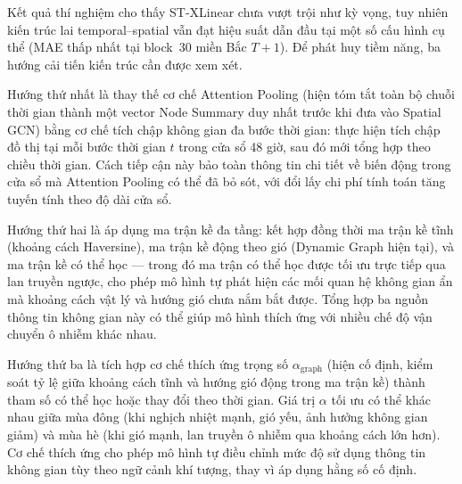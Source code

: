 Kết quả thí nghiệm cho thấy ST-XLinear chưa vượt trội như kỳ vọng, tuy nhiên kiến trúc lai temporal--spatial vẫn đạt hiệu suất dẫn đầu tại một số cấu hình cụ thể (MAE thấp nhất tại block~30 miền Bắc $T{+}1$). Để phát huy tiềm năng, ba hướng cải tiến kiến trúc cần được xem xét.

Hướng thứ nhất là thay thế cơ chế Attention Pooling (hiện tóm tắt toàn bộ chuỗi thời gian thành một vector Node Summary duy nhất trước khi đưa vào Spatial GCN) bằng cơ chế tích chập không gian đa bước thời gian: thực hiện tích chập đồ thị tại mỗi bước thời gian $t$ trong cửa sổ 48 giờ, sau đó mới tổng hợp theo chiều thời gian. Cách tiếp cận này bảo toàn thông tin chi tiết về biến động trong cửa sổ mà Attention Pooling có thể đã bỏ sót, với đổi lấy chi phí tính toán tăng tuyến tính theo độ dài cửa sổ.

Hướng thứ hai là áp dụng ma trận kề đa tầng: kết hợp đồng thời ma trận kề tĩnh (khoảng cách Haversine), ma trận kề động theo gió (Dynamic Graph hiện tại), và ma trận kề có thể học --- trong đó ma trận có thể học được tối ưu trực tiếp qua lan truyền ngược, cho phép mô hình tự phát hiện các mối quan hệ không gian ẩn mà khoảng cách vật lý và hướng gió chưa nắm bắt được. Tổng hợp ba nguồn thông tin không gian này có thể giúp mô hình thích ứng với nhiều chế độ vận chuyển ô nhiễm khác nhau.

Hướng thứ ba là tích hợp cơ chế thích ứng trọng số $\alpha_{\text{graph}}$ (hiện cố định, kiểm soát tỷ lệ giữa khoảng cách tĩnh và hướng gió động trong ma trận kề) thành tham số có thể học hoặc thay đổi theo thời gian. Giá trị $\alpha$ tối ưu có thể khác nhau giữa mùa đông (khi nghịch nhiệt mạnh, gió yếu, ảnh hưởng không gian giảm) và mùa hè (khi gió mạnh, lan truyền ô nhiễm qua khoảng cách lớn hơn). Cơ chế thích ứng cho phép mô hình tự điều chỉnh mức độ sử dụng thông tin không gian tùy theo ngữ cảnh khí tượng, thay vì áp dụng hằng số cố định.
